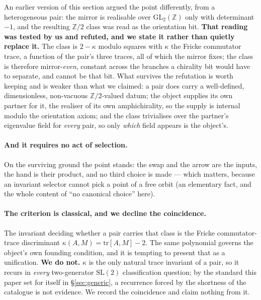 \documentclass[11pt,a4paper]{article}
\theoremstyle{definition}
\theoremstyle{remark}
\newcommand{\Z}{\mathbb{Z}}
\begin{document}
An earlier version of this section argued the point differently, from a heterogeneous pair: the mirror is
realisable over $\mathrm{GL}_2(\Z)$ only with determinant $-1$, and the resulting $\Z/2$ class was read as the
orientation bit. \textbf{That reading was tested by us and refuted, and we state it rather than quietly
replace it.} The class is $2 - \kappa$ modulo squares with $\kappa$ the Fricke commutator trace, a function of
the pair's three traces, all of which the mirror fixes; the class is therefore mirror-\emph{even}, constant
across the branches a chirality bit would have to separate, and cannot be that bit. What survives the
refutation is worth keeping and is weaker than what we claimed: a pair does carry a well-defined, dimensionless,
non-vacuous $\Z/2$-valued datum; the object supplies its own partner for it, the realiser of its own
amphichirality, so the supply is internal modulo the orientation axiom; and the class trivialises over the
partner's eigenvalue field for \emph{every} pair, so only \emph{which} field appears is the object's.

\paragraph{And it requires no act of selection.} On the surviving ground the point stands: the swap and the
arrow are the inputs, the hand is their product, and no third choice is made --- which matters, because an
invariant selector cannot pick a point of a free orbit (an elementary fact, and the whole content of
``no canonical choice'' here).

\paragraph{The criterion is classical, and we decline the coincidence.} The invariant deciding
whether a pair carries that class is the Fricke commutator-trace discriminant
$\kappa(A,M) = \mathrm{tr}[A,M] - 2$. The same polynomial governs the object's own founding
condition, and it is tempting to present that as a unification. \textbf{We do not.} $\kappa$ is the
only natural trace invariant of a pair, so it recurs in \emph{every} two-generator $\mathrm{SL}(2)$
classification question; by the standard this paper set for itself in \S\ref{sec:generic}, a
recurrence forced by the shortness of the catalogue is not evidence. We record the coincidence and
claim nothing from it.
\end{document}
